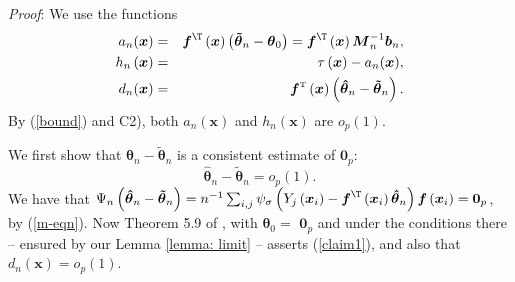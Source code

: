 \documentclass[times, authoryear, 12pt, twoside]{elsarticle}
\begin{document}
\noindent \textit{Proof}: We use the functions 
\begin{eqnarray*}
a_{n}(\boldsymbol{x}) &=&\boldsymbol{f}^{\T}\left( \boldsymbol{x}\right) \left( \boldsymbol{\tilde{\theta}}_{n}-%
\boldsymbol{\theta }_{0}\right) =\boldsymbol{f}^{\T}\left( \boldsymbol{x}%
\right) \boldsymbol{M}_{n}^{-1}\boldsymbol{b}_{n}, \\
h_{n}\left( \boldsymbol{x}\right)  &=&\tau \left( \boldsymbol{x}\right)
-a_{n}(\boldsymbol{x}), \\
d_{n}(\boldsymbol{x}) &=&\boldsymbol{f}^{{\mathrm{\scriptscriptstyle T}}%
}\left( \boldsymbol{x}\right) \left( \boldsymbol{\hat{\theta}}_{n}-%
\boldsymbol{\tilde{\theta}}_{n}\right) .
\end{eqnarray*}%
By (\ref{bound}) and C2), both $a_{n}(\boldsymbol{x})$ and $h_{n}\left( \boldsymbol{x%
}\right) $ are $o_{p}\left( 1\right) $.

We first show that $\boldsymbol{\hat{\theta}}_{n}-\boldsymbol{\tilde{\theta}}%
_{n}$ is a consistent estimate of $\boldsymbol{0}_{p}$: 
\begin{equation}
\boldsymbol{\hat{\theta}}_{n}-\boldsymbol{\tilde{\theta}}_{n}=o_{p}\left(
1\right) .  \label{claim1}
\end{equation}%
We have that $\Psi _{n}\left( \boldsymbol{\hat{\theta}}_{n}-\boldsymbol{%
\tilde{\theta}}_{n}\right) =n^{-1}\sum_{i,j}\psi _{\sigma }\left(
Y_{j}\left( \boldsymbol{x}_{i}\right) -\boldsymbol{f}^{\T}\left( \boldsymbol{x%
}_{i}\right) \boldsymbol{\hat{\theta}}_{n}\right) \boldsymbol{f}\left( 
\boldsymbol{x}_{i}\right) =\boldsymbol{0}_{p}$, by (\ref{m-eqn}). Now
Theorem 5.9 of \cite{vw98}, with $\boldsymbol{\theta }_{0}=$ $\boldsymbol{0}%
_{p}$ and under the conditions there -- ensured by our Lemma \ref{lemma:
limit} -- asserts (\ref{claim1}), and also that $d_{n}(\boldsymbol{x}%
)=o_{p}\left( 1\right) $.
\end{document}
